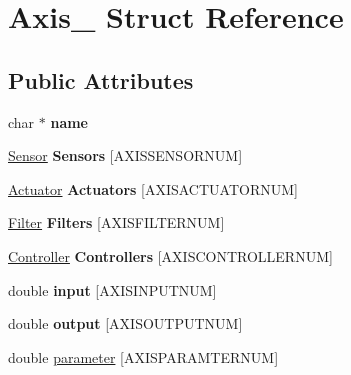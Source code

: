 \hypertarget{struct_axis__}{}\section{Axis\+\_\+ Struct Reference}
\label{struct_axis__}
\subsection*{Public Attributes}
\begin{DoxyCompactItemize}
\item 
\mbox{\label{struct_axis___a82f0b523be503cf7266f6a2ccd3c8545}} 
char $\ast$ {\bfseries name}
\item 
\mbox{\label{struct_axis___ac37460521b5dfdd7b54687c5f8729a17}} 
\hyperlink{struct_sensor__}{Sensor} {\bfseries Sensors} \mbox{[}A\+X\+I\+S\+S\+E\+N\+S\+O\+R\+N\+UM\mbox{]}
\item 
\mbox{\label{struct_axis___aa240421c4efb54975e6fd5f116f31772}} 
\hyperlink{struct_actuator__}{Actuator} {\bfseries Actuators} \mbox{[}A\+X\+I\+S\+A\+C\+T\+U\+A\+T\+O\+R\+N\+UM\mbox{]}
\item 
\mbox{\label{struct_axis___a87ebe8373f74f0c5050db07464847c22}} 
\hyperlink{struct_filter}{Filter} {\bfseries Filters} \mbox{[}A\+X\+I\+S\+F\+I\+L\+T\+E\+R\+N\+UM\mbox{]}
\item 
\mbox{\label{struct_axis___afcbb11da83ee69702ad049082446514c}} 
\hyperlink{struct_controller__}{Controller} {\bfseries Controllers} \mbox{[}A\+X\+I\+S\+C\+O\+N\+T\+R\+O\+L\+L\+E\+R\+N\+UM\mbox{]}
\item 
\mbox{\label{struct_axis___a780ca7d0be1242218d0f093dfbfe44e3}} 
double {\bfseries input} \mbox{[}A\+X\+I\+S\+I\+N\+P\+U\+T\+N\+UM\mbox{]}
\item 
\mbox{\label{struct_axis___a34b3f6ca9858974323431a7d51139751}} 
double {\bfseries output} \mbox{[}A\+X\+I\+S\+O\+U\+T\+P\+U\+T\+N\+UM\mbox{]}
\item 
\mbox{\label{struct_axis___a8481862ae11722ece21321c5f6a481b0}} 
double \hyperlink{struct_axis___a8481862ae11722ece21321c5f6a481b0}{parameter} \mbox{[}A\+X\+I\+S\+P\+A\+R\+A\+M\+T\+E\+R\+N\+UM\mbox{]}

\end{DoxyCompactItemize}
